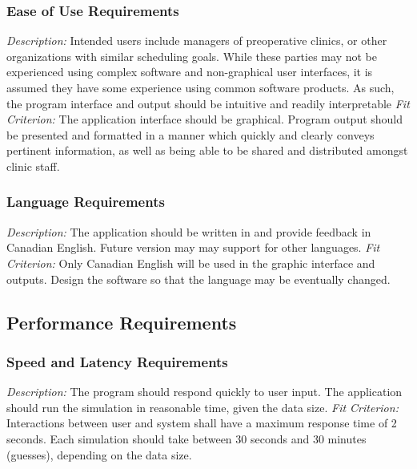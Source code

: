 \documentclass[12pt, titlepage]{article}
\begin{document}
\subsubsection{Ease of Use Requirements}
\textit{Description:}\newline
Intended users include managers of preoperative clinics, or other organizations with similar scheduling goals. While these parties may not be experienced using complex software and non-graphical user interfaces, it is assumed they have some experience using common software products. As such, the program interface and output should be intuitive and readily interpretable
\newline \newline 
\textit{Fit Criterion:}\newline 
The application interface should be graphical.
Program output should be presented and formatted in a manner which quickly and clearly conveys pertinent information, as well as being able to be shared and distributed amongst clinic staff.
\subsubsection{Language Requirements}
\textit{Description:}\newline
The application should be written in and provide feedback in Canadian English. Future version may may support for other languages.
\newline \newline 
\textit{Fit Criterion:}\newline 
Only Canadian English will be used in the graphic interface and outputs.
Design the software so that the language may be eventually changed.

\subsection{Performance Requirements}
\subsubsection{Speed and Latency Requirements}
\textit{Description:}\newline
The program should respond quickly to user input. The application should run the simulation in reasonable time, given the data size.
\newline \newline 
\textit{Fit Criterion:}\newline 
Interactions between user and system shall have a maximum response time of 2 seconds. Each simulation should take between 30 seconds and 30 minutes (guesses), depending on the data size.
\end{document}
